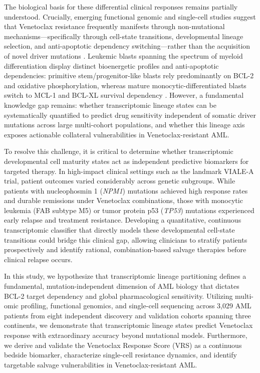 \documentclass[11pt,a4paper]{article}
\begin{document}
The biological basis for these differential clinical responses remains partially understood. Crucially, emerging functional genomic and single-cell studies suggest that Venetoclax resistance frequently manifests through non-mutational mechanisms—specifically through cell-state transitions, developmental lineage selection, and anti-apoptotic dependency switching—rather than the acquisition of novel driver mutations \cite{tyner2018beataml,bottomly2022beataml,vangalen2019single,pei2020monocytic}. Leukemic blasts spanning the spectrum of myeloid differentiation display distinct bioenergetic profiles and anti-apoptotic dependencies: primitive stem/progenitor-like blasts rely predominantly on BCL-2 and oxidative phosphorylation, whereas mature monocytic-differentiated blasts switch to MCL-1 and BCL-XL survival dependency \cite{pei2020monocytic,lagadinou2013bcl2,pollyea2018oxphos,moujalled2019mcl1}. However, a fundamental knowledge gap remains: whether transcriptomic lineage states can be systematically quantified to predict drug sensitivity independent of somatic driver mutations across large multi-cohort populations, and whether this lineage axis exposes actionable collateral vulnerabilities in Venetoclax-resistant AML.

To resolve this challenge, it is critical to determine whether transcriptomic developmental cell maturity states act as independent predictive biomarkers for targeted therapy. In high-impact clinical settings such as the landmark VIALE-A trial, patient outcomes varied considerably across genetic subgroups. While patients with nucleophosmin 1 (\textit{NPM1}) mutations achieved high response rates and durable remissions under Venetoclax combinations, those with monocytic leukemia (FAB subtype M5) or tumor protein p53 (\textit{TP53}) mutations experienced early relapse and treatment resistance. Developing a quantitative, continuous transcriptomic classifier that directly models these developmental cell-state transitions could bridge this clinical gap, allowing clinicians to stratify patients prospectively and identify rational, combination-based salvage therapies before clinical relapse occurs.

In this study, we hypothesize that transcriptomic lineage partitioning defines a fundamental, mutation-independent dimension of AML biology that dictates BCL-2 target dependency and global pharmacological sensitivity. Utilizing multi-omic profiling, functional genomics, and single-cell sequencing across 3,029 AML patients from eight independent discovery and validation cohorts spanning three continents, we demonstrate that transcriptomic lineage states predict Venetoclax response with extraordinary accuracy beyond mutational models. Furthermore, we derive and validate the Venetoclax Response Score (VRS) as a continuous bedside biomarker, characterize single-cell resistance dynamics, and identify targetable salvage vulnerabilities in Venetoclax-resistant AML.
\end{document}
